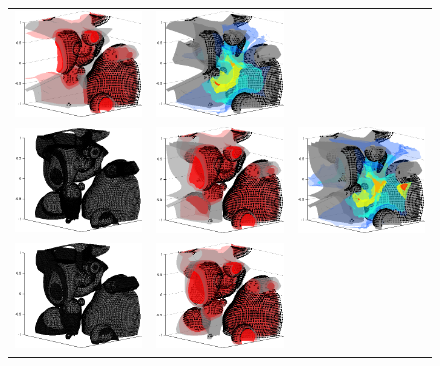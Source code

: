 \begin{figure}
\begin{tabular}{ccc}
\includegraphics[width=1.5in]{marginal_03}&
\includegraphics[width=1.5in]{energy_03}\\
\includegraphics[width=1.5in]{view_04}&
\includegraphics[width=1.5in]{marginal_04}&
\includegraphics[width=1.5in]{energy_04}\\
\includegraphics[width=1.5in]{view_05}&
\includegraphics[width=1.5in]{marginal_05}&

\end{tabular}
\end{figure}
